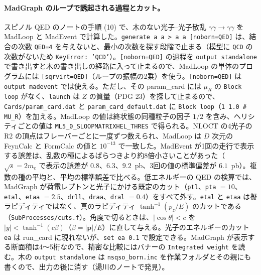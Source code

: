 \documentclass[a4paper,10pt]{ltjsarticle}
\begin{document}
\paragraph{MadGraph のループで誘起される過程とカット。}スピノル QED のノートの手順 (10) で、木のない光子--光子散乱 $\gamma\gamma\to\gamma\gamma$ を MadLoop と MadEvent で計算した。\texttt{generate a a > a a [noborn=QED]} は、結合の次数 \texttt{QED=4} を与えないと、最小の次数を探す段階で止まる（模型に \texttt{QCD} の次数がないため \texttt{KeyError: 'QCD'}）。\texttt{[noborn=QED]} の過程を \texttt{output standalone} で書き出すと木の書き出しの経路に入って止まるので、MadLoop の単体のプログラムには \texttt{[sqrvirt=QED]}（ループの振幅の2乗）を使う。\texttt{[noborn=QED]} は \texttt{output madevent} では使える。ただし、その param\_card には $\mu_R$ の \texttt{Block loop} がなく、\texttt{launch} は $Z$ の質量（PDG 23）を探して止まるので、\texttt{Cards/param\_card.dat} と \texttt{param\_card\_default.dat} に \texttt{Block loop}（\texttt{1 1.0 \# MU\_R}）を加える。MadLoop の値は終状態の同種粒子の因子 $1/2$ を含み、ヘリシティごとの値は \texttt{ML5\_0\_SLOOPMATRIXHEL\_THRES} で得られる。NLOCT の4光子の R2 の頂点はフレーバーごとに一度ずつ数えられ、MadLoop は $D$ 次元の FeynCalc と FormCalc の値と $10^{-13}$ で一致した。MadEvent が1回の走行で表示する誤差は、乱数の種によるばらつきより約8倍小さいことがあった（$\sqrt s=2m_e$ で表示の誤差が $0.8$、$6.3$、$9.2$~pb、3回の値の標準偏差が $6.1$~pb）。複数の種の平均と、平均の標準誤差で比べる。低エネルギーの QED の検算では、MadGraph が荷電レプトンと光子にかける既定のカット（\texttt{ptl}、\texttt{pta} $=10$、\texttt{etal}、\texttt{etaa} $=2.5$、\texttt{drll}、\texttt{draa}、\texttt{dral} $=0.4$）をすべて外す。\texttt{etal} と \texttt{etaa} は擬ラピディティではなく、真のラピディティ $\tanh^{-1}(p_z/E)$ のカットである（\texttt{SubProcesses/cuts.f}）。角度で切るときは、$|\cos\theta|<c$ を $|y|<\tanh^{-1}(c\beta)$（$\beta=|\boldsymbol p|/E$）に直して与える。光子のエネルギーのカット \texttt{ea} は run\_card に現れないが、\texttt{set ea 0.1} で設定できる。MadGraph が表示する断面積は4〜5桁なので、精密な比較にはバナーの \texttt{Integrated weight} を読む。木の \texttt{output standalone} は \texttt{nsqso\_born.inc} を作業フォルダとその親にも書くので、出力の後に消す（湯川のノートで発見）。
\end{document}
